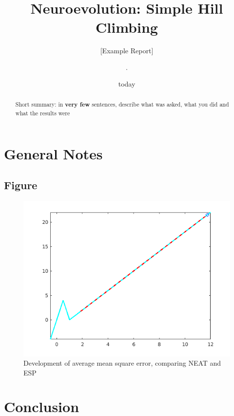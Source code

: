 \documentclass{hbrs-ecta-report}
\begin{document}

\title{Neuroevolution: Simple Hill Climbing}
\subtitle{[Example Report]}

\author{
\alignauthor
.
}

\date{today}
\maketitle
\begin{abstract}
Short summary: in \textbf{very few} sentences, describe what was asked, what you did and what the results were
\end{abstract}

\section{General Notes}

\FloatBarrier
\newpage
\subsection{Figure}

\begin{figure}[ht!]
\centering
\includegraphics[width=\linewidth]{img/plot_fit_max.png}
\caption{Development of average mean square error, comparing NEAT and ESP}
\label{fig:1} 
\end{figure}

\FloatBarrier
\section{Conclusion}



 
\end{document}
